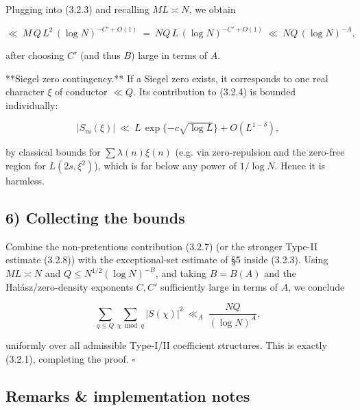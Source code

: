\documentclass[11pt]{article}
\theoremstyle{definition}
\theoremstyle{remark}
\begin{document}
Plugging into (3.2.3) and recalling $ML\asymp N$, we obtain

$$
\ll\ M\,Q\,L^2\,(\log N)^{-C'+O(1)}
\ =\ NQ\,L\,(\log N)^{-C'+O(1)}
\ \ll\ NQ\,(\log N)^{-A},
$$

after choosing $C'$ (and thus $B$) large in terms of $A$.

**Siegel zero contingency.** If a Siegel zero exists, it corresponds to one real character $\xi$ of conductor $\ll Q$. Its contribution to (3.2.4) is bounded individually:

$$
|S_m(\xi)|\ \ll\ L\,\exp\!\{-c\sqrt{\log L}\}+O(L^{1-\delta}),
$$

by classical bounds for $\sum \lambda(n)\xi(n)$ (e.g. via zero-repulsion and the zero-free region for $L(2s,\xi^2)$), which is far below any power of $1/\log N$. Hence it is harmless.

\subsection*{6) Collecting the bounds}

Combine the non-pretentious contribution (3.2.7) (or the stronger Type-II estimate (3.2.8)) with the exceptional-set estimate of §5 inside (3.2.3). Using $ML\asymp N$ and $Q\le N^{1/2}(\log N)^{-B}$, and taking $B=B(A)$ and the Halász/zero-density exponents $C,C'$ sufficiently large in terms of $A$, we conclude

$$
\sum_{q\le Q}\sum_{\chi\bmod q}|S(\chi)|^2\ \ll_A\ \frac{NQ}{(\log N)^A},
$$

uniformly over all admissible Type-I/II coefficient structures. This is exactly (3.2.1), completing the proof. $\square$


\subsection*{Remarks \& implementation notes}
\end{document}
